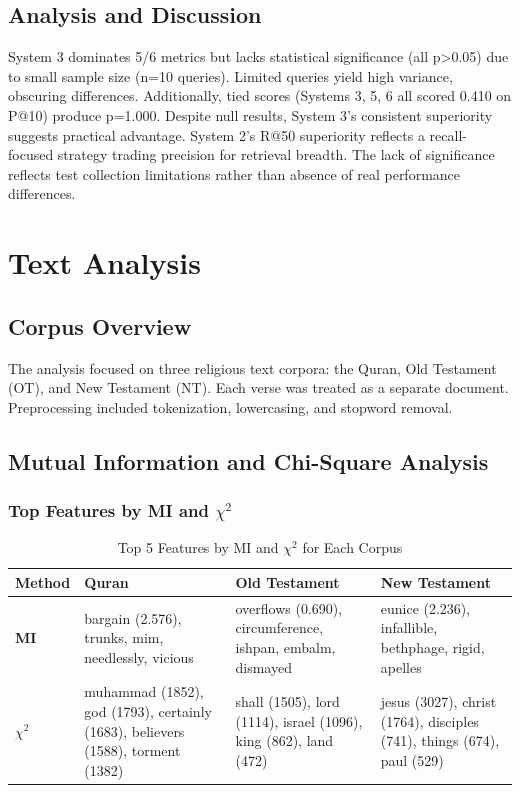 \documentclass[10pt,a4paper]{article}
\begin{document}
\subsection{Analysis and Discussion}

System 3 dominates 5/6 metrics but lacks statistical significance (all p>0.05) due to small sample size (n=10 queries). Limited queries yield high variance, obscuring differences. Additionally, tied scores (Systems 3, 5, 6 all scored 0.410 on P@10) produce p=1.000. Despite null results, System 3's consistent superiority suggests practical advantage. System 2's R@50 superiority reflects a recall-focused strategy trading precision for retrieval breadth. The lack of significance reflects test collection limitations rather than absence of real performance differences.

\section{Text Analysis}

\subsection{Corpus Overview}
The analysis focused on three religious text corpora: the Quran, Old Testament (OT), and New Testament (NT). Each verse was treated as a separate document. Preprocessing included tokenization, lowercasing, and stopword removal.

\subsection{Mutual Information and Chi-Square Analysis}


\subsubsection{Top Features by MI and $\chi^2$}

\begin{table}[h]
\centering
\caption{Top 5 Features by MI and $\chi^2$ for Each Corpus}
\label{tab:features_combined}
\scriptsize
\begin{tabular}{p{2cm}p{3.8cm}p{3.8cm}p{3.8cm}}
\toprule
\textbf{Method} & \textbf{Quran} & \textbf{Old Testament} & \textbf{New Testament} \\
\midrule
\textbf{MI} & bargain (2.576), trunks, mim, needlessly, vicious & overflows (0.690), circumference, ishpan, embalm, dismayed & eunice (2.236), infallible, bethphage, rigid, apelles \\
\midrule
\textbf{$\chi^2$} & muhammad (1852), god (1793), certainly (1683), believers (1588), torment (1382) & shall (1505), lord (1114), israel (1096), king (862), land (472) & jesus (3027), christ (1764), disciples (741), things (674), paul (529) \\
\bottomrule
\end{tabular}
\end{table}
\end{document}
